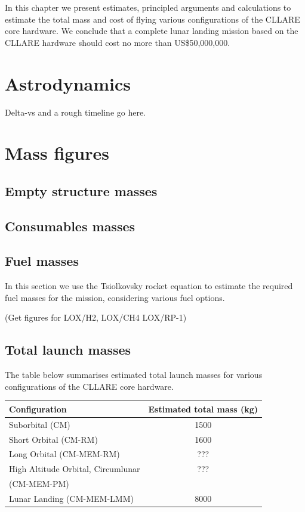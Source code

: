 \documentclass{report}
\begin{document}
In this chapter we present estimates, principled arguments and calculations to estimate the total mass and cost of flying various configurations of the CLLARE core hardware.  We conclude that a complete lunar landing mission based on the CLLARE hardware should cost no more than US\$50,000,000.

\section{Astrodynamics}

Delta-vs and a rough timeline go here.

\section{Mass figures}

\subsection{Empty structure masses}

\subsection{Consumables masses}

\subsection{Fuel masses}

In this section we use the Tsiolkovsky rocket equation to estimate the required fuel masses for the mission, considering various fuel options.

(Get figures for LOX/H2, LOX/CH4 LOX/RP-1)

\subsection{Total launch masses}

The table below summarises estimated total launch masses for various configurations of the CLLARE core hardware.

\begin{tabular}{ | l | c | }
\hline
Configuration & Estimated total mass (kg) \\
\hline
\hline
Suborbital (CM) & 1500 \\
\hline
Short Orbital (CM-RM) & 1600 \\
\hline
Long Orbital (CM-MEM-RM) & ??? \\
\hline
High Altitude Orbital, Circumlunar & ??? \\
(CM-MEM-PM) & \\
\hline
Lunar Landing (CM-MEM-LMM) & 8000 \\
\hline
\end{tabular}
\end{document}
